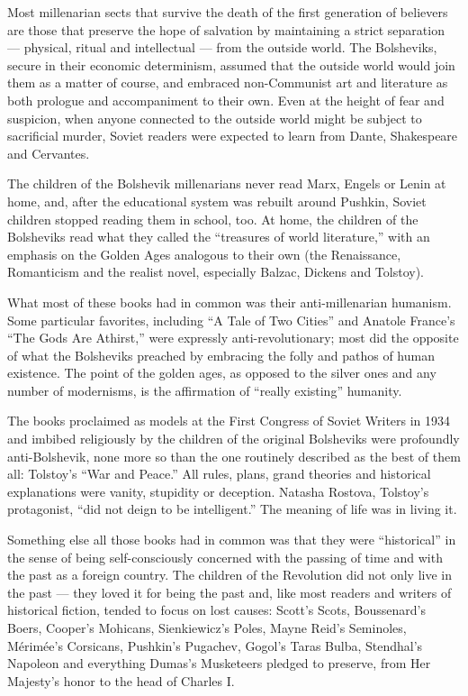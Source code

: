 Most millenarian sects that survive the death of the first generation of
believers are those that preserve the hope of salvation by maintaining a
strict separation --- physical, ritual and intellectual --- from the
outside world. The Bolsheviks, secure in their economic determinism,
assumed that the outside world would join them as a matter of course,
and embraced non-Communist art and literature as both prologue and
accompaniment to their own. Even at the height of fear and suspicion,
when anyone connected to the outside world might be subject to
sacrificial murder, Soviet readers were expected to learn from Dante,
Shakespeare and Cervantes.

The children of the Bolshevik millenarians never read Marx, Engels or
Lenin at home, and, after the educational system was rebuilt around
Pushkin, Soviet children stopped reading them in school, too. At home,
the children of the Bolsheviks read what they called the ``treasures of
world literature,'' with an emphasis on the Golden Ages analogous to
their own (the Renaissance, Romanticism and the realist novel,
especially Balzac, Dickens and Tolstoy).

What most of these books had in common was their anti-millenarian
humanism. Some particular favorites, including ``A Tale of Two Cities''
and Anatole France's ``The Gods Are Athirst,'' were expressly
anti-revolutionary; most did the opposite of what the Bolsheviks
preached by embracing the folly and pathos of human existence. The point
of the golden ages, as opposed to the silver ones and any number of
modernisms, is the affirmation of ``really existing'' humanity.

The books proclaimed as models at the First Congress of Soviet Writers
in 1934 and imbibed religiously by the children of the original
Bolsheviks were profoundly anti-Bolshevik, none more so than the one
routinely described as the best of them all: Tolstoy's ``War and
Peace.'' All rules, plans, grand theories and historical explanations
were vanity, stupidity or deception. Natasha Rostova, Tolstoy's
protagonist, ``did not deign to be intelligent.'' The meaning of life
was in living it.

Something else all those books had in common was that they were
``historical'' in the sense of being self-consciously concerned with the
passing of time and with the past as a foreign country. The children of
the Revolution did not only live in the past --- they loved it for being
the past and, like most readers and writers of historical fiction,
tended to focus on lost causes: Scott's Scots, Boussenard's Boers,
Cooper's Mohicans, Sienkiewicz's Poles, Mayne Reid's Seminoles,
Mérimée's Corsicans, Pushkin's Pugachev, Gogol's Taras Bulba, Stendhal's
Napoleon and everything Dumas's Musketeers pledged to preserve, from Her
Majesty's honor to the head of Charles I.

